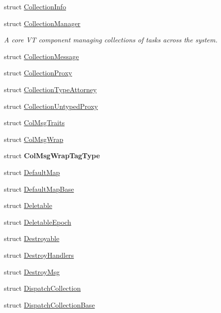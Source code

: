 \begin{DoxyCompactItemize}
struct \hyperlink{structvt_1_1vrt_1_1collection_1_1_collection_info}{Collection\+Info}
\item 
struct \hyperlink{structvt_1_1vrt_1_1collection_1_1_collection_manager}{Collection\+Manager}
\begin{DoxyCompactList}\small\item\em A core VT component managing collections of tasks across the system. \end{DoxyCompactList}\item 
struct \hyperlink{structvt_1_1vrt_1_1collection_1_1_collection_message}{Collection\+Message}
\item 
struct \hyperlink{structvt_1_1vrt_1_1collection_1_1_collection_proxy}{Collection\+Proxy}
\item 
struct \hyperlink{structvt_1_1vrt_1_1collection_1_1_collection_type_attorney}{Collection\+Type\+Attorney}
\item 
struct \hyperlink{structvt_1_1vrt_1_1collection_1_1_collection_untyped_proxy}{Collection\+Untyped\+Proxy}
\item 
struct \hyperlink{structvt_1_1vrt_1_1collection_1_1_col_msg_traits}{Col\+Msg\+Traits}
\item 
struct \hyperlink{structvt_1_1vrt_1_1collection_1_1_col_msg_wrap}{Col\+Msg\+Wrap}
\item 
struct {\bfseries Col\+Msg\+Wrap\+Tag\+Type}
\item 
struct \hyperlink{structvt_1_1vrt_1_1collection_1_1_default_map}{Default\+Map}
\item 
struct \hyperlink{structvt_1_1vrt_1_1collection_1_1_default_map_base}{Default\+Map\+Base}
\item 
struct \hyperlink{structvt_1_1vrt_1_1collection_1_1_deletable}{Deletable}
\item 
struct \hyperlink{structvt_1_1vrt_1_1collection_1_1_deletable_epoch}{Deletable\+Epoch}
\item 
struct \hyperlink{structvt_1_1vrt_1_1collection_1_1_destroyable}{Destroyable}
\item 
struct \hyperlink{structvt_1_1vrt_1_1collection_1_1_destroy_handlers}{Destroy\+Handlers}
\item 
struct \hyperlink{structvt_1_1vrt_1_1collection_1_1_destroy_msg}{Destroy\+Msg}
\item 
struct \hyperlink{structvt_1_1vrt_1_1collection_1_1_dispatch_collection}{Dispatch\+Collection}
\item 
struct \hyperlink{structvt_1_1vrt_1_1collection_1_1_dispatch_collection_base}{Dispatch\+Collection\+Base}

\end{DoxyCompactItemize}
